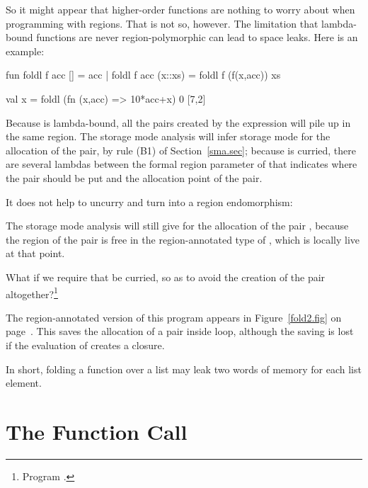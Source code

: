 \documentclass[12pt]{book}
\begin{document}
So it might appear that higher-order functions are nothing to worry about when
programming with regions. That is not so, however. The limitation that
lambda-bound functions are never region-polymorphic can lead to space
leaks. Here is an example:
\begin{smlcode}
  fun foldl f acc [] = acc
    | foldl f acc (x::xs)  = foldl f (f(x,acc)) xs

  val x = foldl (fn (x,acc) => 10*acc+x) 0 [7,2]
\end{smlcode}
Because  is lambda-bound, all the pairs created by the expression
 will pile up in the same region. The storage mode analysis will
infer storage mode  for the allocation of the pair, by rule (B1) of
Section~\ref{sma.sec}; because  is curried, there are several lambdas
between the formal region parameter of  that indicates where the pair
should be put and the allocation point of the pair.

It does not help to uncurry  and turn  into a
region endomorphism:
The storage mode analysis will still give  for the allocation of the
pair , because the region of the pair is free in the
region-annotated type of , which is locally live at that point.

What if we require that  be curried, so as to avoid the creation of the
pair altogether?\footnote{Program .}
The region-annotated version of this program appears in Figure~\ref{fold2.fig}
on page~\pageref{fold2.fig}. This saves the allocation of a pair inside loop,
although the saving is lost if the evaluation of  creates a closure.

In short, folding a function over a list may leak two words of memory for each
list element.

\chapter{The Function Call}
\end{document}

